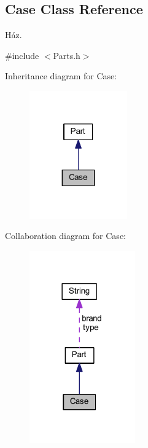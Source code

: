 \hypertarget{class_case}{}\subsection{Case Class Reference}
\label{class_case}


Ház.  




{\ttfamily \#include $<$Parts.\+h$>$}



Inheritance diagram for Case\+:
\nopagebreak
\begin{figure}[H]
\begin{center}
\leavevmode
\includegraphics[width=119pt]{class_case__inherit__graph}
\end{center}
\end{figure}


Collaboration diagram for Case\+:
\nopagebreak
\begin{figure}[H]
\begin{center}
\leavevmode
\includegraphics[width=129pt]{class_case__coll__graph}
\end{center}
\end{figure}
